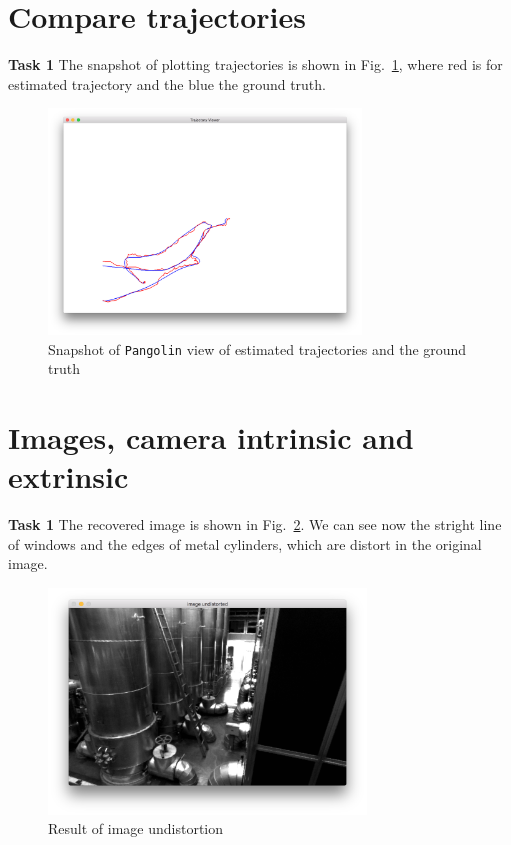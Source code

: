 \documentclass[12pt,a4paper]{article}
\begin{document}
    \section{Compare trajectories}
    \textsf{\textbf{Task 1}}
    The snapshot of plotting trajectories is shown in Fig.~\ref{fig:draw_trajectory},
    where red is for estimated trajectory and the blue the ground truth.
    \begin{figure}[!h]
        \centering
        \includegraphics[height=6cm]{fig/draw_trajectory.png}
        \caption{Snapshot of \texttt{Pangolin} view of estimated trajectories and the ground truth}
        \label{fig:draw_trajectory}
    \end{figure}

    
    \section{Images, camera intrinsic and extrinsic}
    \textsf{\textbf{Task 1}}
    The recovered image is shown in Fig.~\ref{fig:undistort_image}.
    We can see now the stright line of windows and the edges of metal cylinders,
    which are distort in the original image.
    \begin{figure}[!h]
        \centering
        \includegraphics[height=6cm]{fig/undistort_image.png}
        \caption{Result of image undistortion}
        \label{fig:undistort_image}
    \end{figure}
\end{document}
